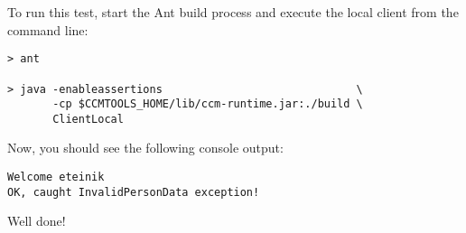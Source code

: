 To run this test, start the Ant build process and execute the local client
from the command line:
\begin{footnotesize}
\begin{verbatim}
> ant

> java -enableassertions                              \
       -cp $CCMTOOLS_HOME/lib/ccm-runtime.jar:./build \
       ClientLocal
\end{verbatim}
\end{footnotesize}

Now, you should see the following console output:
\begin{footnotesize}
\begin{verbatim}
Welcome eteinik
OK, caught InvalidPersonData exception!
\end{verbatim}
\end{footnotesize}

Well done! 

\newpage
